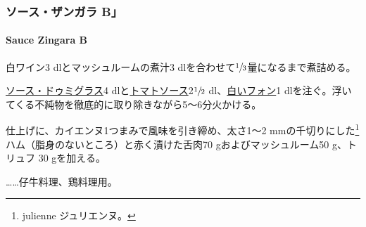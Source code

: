 \hypertarget{ux30bdux30fcux30b9ux30b6ux30f3ux30acux30e9-b}{%
\subsubsection{ソース・ザンガラ
B」}\label{ux30bdux30fcux30b9ux30b6ux30f3ux30acux30e9-b}}

\hypertarget{sauce-zingara-b}{%
\paragraph{Sauce Zingara B}\label{sauce-zingara-b}}

白ワイン3 dlとマッシュルームの煮汁3
dlを合わせて\(\sfrac{1}{3}\)量になるまで煮詰める。

\protect\hyperlink{sauce-demi-glace}{ソース・ドゥミグラス}4
dlと\protect\hyperlink{sauce-tomate}{トマトソース}2\(\sfrac{1}{2}\)
dl、\protect\hyperlink{fonds-blanc}{白いフォン}1
dlを注ぐ。浮いてくる不純物を徹底的に取り除きながら5〜6分火かける。

仕上げに、カイエンヌ1つまみで風味を引き締め、太さ1〜2
mmの千切りにした\footnote{julienne ジュリエンヌ。}ハム（脂身のないところ）と赤く漬けた舌肉70
gおよびマッシュルーム50 g、トリュフ 30 gを加える。

\ldots{}\ldots{}仔牛料理、鶏料理用。
